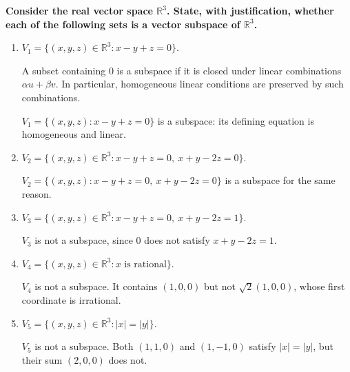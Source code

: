 \providecommand{\rank}{\operatorname{r}}
\providecommand{\RR}{\mathbb R}
\providecommand{\CC}{\mathbb C}
\providecommand{\KK}{\mathbb K}

\setcounter{enumi}{60}
\item {\bfseries\boldmath
Consider the real vector space $\RR^3$. State, with justification, whether each of the following sets is a vector subspace of $\RR^3$.
}

\begin{enumerate}[label=\alph*)]

\item $V_1=\{(x,y,z)\in\RR^3:x-y+z=0\}$.

\begin{answer}
A subset containing $0$ is a subspace if it is closed under linear
combinations $\alpha u+\beta v$. In particular, homogeneous linear conditions
are preserved by such combinations.

$V_1=\{(x,y,z):x-y+z=0\}$ is a subspace: its defining equation is homogeneous and linear.
\end{answer}

\item $V_2=\{(x,y,z)\in\RR^3:x-y+z=0,\ x+y-2z=0\}$.

\begin{answer}
$V_2=\{(x,y,z):x-y+z=0,\ x+y-2z=0\}$ is a subspace for the same reason.
\end{answer}

\item $V_3=\{(x,y,z)\in\RR^3:x-y+z=0,\ x+y-2z=1\}$.

\begin{answer}
$V_3$ is not a subspace, since $0$ does not satisfy $x+y-2z=1$.
\end{answer}

\item $V_4=\{(x,y,z)\in\RR^3:x\text{ is rational}\}$.

\begin{answer}
$V_4$ is not a subspace. It contains $(1,0,0)$ but not
$\sqrt2(1,0,0)$, whose first coordinate is irrational.
\end{answer}

\item $V_5=\{(x,y,z)\in\RR^3:|x|=|y|\}$.

\begin{answer}
$V_5$ is not a subspace. Both $(1,1,0)$ and $(1,-1,0)$ satisfy
$|x|=|y|$, but their sum $(2,0,0)$ does not.
\end{answer}


\end{enumerate}
